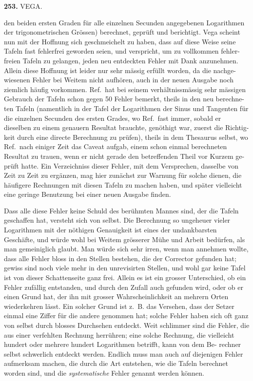 \documentclass[12pt,a4paper]{article}
\begin{document}
\newpage
\noindent\textbf{253.}\quad
VEGA.

\smallskip\noindent
den beiden ersten Graden für alle einzelnen Secunden angegebenen Logarithmen
der trigonometrischen Grössen) berechnet, geprüft und berichtigt. Vega scheint
nun mit der Hoffnung sich geschmeichelt zu haben, dass auf diese Weise seine
Tafeln fast fehlerfrei geworden seien, und verspricht, um zu vollkommen fehler-
freien Tafeln zu gelangen, jeden neu entdeckten Fehler mit Dank anzunehmen.
Allein diese Hoffnung ist leider nur sehr mässig erfüllt worden, da die nachge-
wiesenen Fehler bei Weitem nicht aufhören, auch in der neuen Ausgabe noch
ziemlich häufig vorkommen. Ref.\ hat bei seinem verhältnissmässig sehr mässigen
Gebrauch der Tafeln schon gegen 50 Fehler bemerkt, theils in den neu berechne-
ten Tafeln (namentlich in der Tafel der Logarithmen der Sinus und Tangenten
für die einzelnen Secunden des ersten Grades, wo Ref.\ fast immer, sobald er
dieselben zu einem genauern Resultat brauchte, genöthigt war, zuerst die Richtig-
keit durch eine directe Berechnung zu prüfen), theils in dem Thesaurus selbst,
wo Ref.\ nach einiger Zeit das Caveat aufgab, einem schon einmal berechneten
Resultat zu trauen, wenn er nicht gerade den betreffenden Theil vor Kurzem ge-
prüft hatte. Ein Verzeichniss dieser Fehler, mit dem Versprechen, dasselbe von
Zeit zu Zeit zu ergänzen, mag hier zunächst zur Warnung für solche dienen, die
häufigere Rechnungen mit diesen Tafeln zu machen haben, und später vielleicht
eine geringe Benutzung bei einer neuen Ausgabe finden.

\smallskip\noindent
Dass alle diese Fehler keine Schuld des berühmten Mannes sind, der die
Tafeln geschaffen hat, versteht sich von selbst. Die Berechnung so ungeheuer
vieler Logarithmen mit der nöthigen Genauigkeit ist eines der undankbarsten
Geschäfte, und würde wohl bei Weitem grösserer Mühe und Arbeit bedürfen, als
man gemeiniglich glaubt. Man würde sich sehr irren, wenn man annehmen wollte,
dass alle Fehler bloss in den Stellen bestehen, die der Corrector gefunden hat;
gewiss sind noch viele mehr in den unrevisirten Stellen, und wohl gar keine
Tafel ist von dieser Schattenseite ganz frei. Allein es ist ein grosser Unterschied,
ob ein Fehler zufällig entstanden, und durch den Zufall auch gefunden wird, oder
ob er einen Grund hat, der ihn mit grosser Wahrscheinlichkeit an mehrern Orten
wiederkehren lässt. Ein solcher Grund ist z.~B. das Versehen, dass der Setzer
einmal eine Ziffer für die andere genommen hat; solche Fehler haben sich oft
ganz von selbst durch blosses Durchsehen entdeckt. Weit schlimmer sind die
Fehler, die aus einer verfehlten Rechnung herrühren; eine solche Rechnung, die
vielleicht hundert oder mehrere hundert Logarithmen betrifft, kann von dem Be-
rechner selbst schwerlich entdeckt werden. Endlich muss man auch auf diejenigen
Fehler aufmerksam machen, die durch die Art entstehen, wie die Tafeln berechnet
worden sind, und die \textit{systematische} Fehler genannt werden können.
\end{document}
